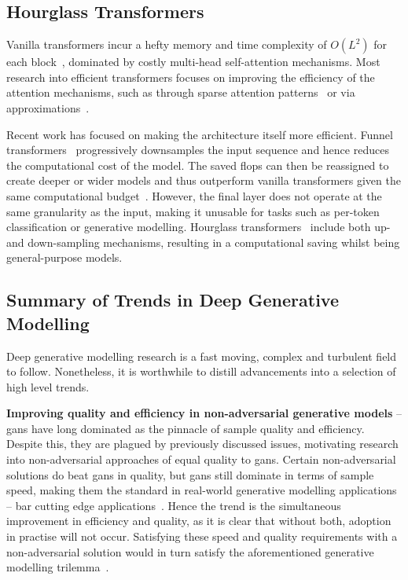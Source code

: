 \subsection{Hourglass Transformers}
\label{subsec:hourglass}

Vanilla transformers incur a hefty memory and time complexity of $O(L^2)$ for
each block~\cite{vaswani2017attention}, dominated by costly multi-head
self-attention mechanisms. Most research into efficient transformers focuses on
improving the efficiency of the attention mechanisms, such as through sparse
attention patterns~\cite{child2019generating} or via
approximations~\cite{xiong2021nystromformer}.

Recent work has focused on making the architecture itself more efficient. Funnel
transformers~\cite{dai2020funneltransformer} progressively downsamples the input
sequence and hence reduces the computational cost of the model. The saved
\glspl{flop} can then be reassigned to create deeper or wider models and thus
outperform vanilla transformers given the same computational
budget~\cite{dai2020funneltransformer}. However, the final layer does not
operate at the same granularity as the input, making it unusable for tasks such
as per-token classification or generative modelling. Hourglass
transformers~\cite{nawrot2021hierarchical} include both up- and down-sampling
mechanisms, resulting in a computational saving whilst being general-purpose
models.

\subsection{Summary of Trends in Deep Generative Modelling}
\label{subsec:trends}

Deep generative modelling research is a fast moving, complex and turbulent field
to follow. Nonetheless, it is worthwhile to distill advancements into a
selection of high level trends.

\textbf{Improving quality and efficiency in non-adversarial generative models} -- 
\glspl{gan} have long dominated as the pinnacle of sample quality and
efficiency. Despite this, they are plagued by previously discussed issues,
motivating research into non-adversarial approaches of equal quality to
\glspl{gan}. Certain non-adversarial solutions do beat \glspl{gan} in quality,
but \glspl{gan} still dominate in terms of sample speed, making them the
standard in real-world generative modelling applications -- bar cutting
edge applications~\cite{ramesh2021dalle,ramesh2022dalle2}. Hence the trend is
the simultaneous improvement in efficiency and quality, as it is clear that
without both, adoption in practise will not occur. Satisfying these speed and
quality requirements with a non-adversarial solution would in turn satisfy the
aforementioned generative modelling trilemma~\cite{xiao2021trilemma}.

